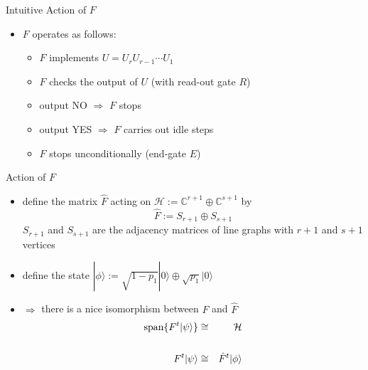\documentclass[slideColor]{prosper}
\newcommand{\C}{{\mathbb{C}}}
\newcommand{\cH}{{\mathcal{H}}}
\renewcommand{\>}{\rangle}
\newcommand{\<}{\langle}
\begin{document}
\begin{slide}{Intuitive Action of $F$}

\begin{itemize}
\item $F$ operates as follows:

\begin{itemize}
\item $F$ implements $U=U_r U_{r-1} \cdots U_1$

\medskip
\item $F$ checks the output of $U$ (with read-out gate $R$)

\medskip
\item \quad output NO $\Rightarrow$ $F$ stops

\medskip
\item \quad output YES $\Rightarrow$ $F$ carries out idle steps

\medskip
\item $F$ stops unconditionally (end-gate $E$)
\end{itemize}
\end{itemize}

\end{slide}


\begin{slide}{Action of $F$}

\begin{itemize}

\item define the matrix $\hat{F}$ acting on $\cH:=\C^{r+1}\oplus \C^{s+1}$ by 
\[
\hat{F}:=S_{r+1} \oplus S_{s+1}
\]
$S_{r+1}$ and $S_{s+1}$ are the adjacency matrices of line graphs with $r+1$ and $s+1$ vertices

\medskip
\item define the state $|\phi\>:=\sqrt{1-p_1} |0\> \oplus \sqrt{p_1} |0\>$

\medskip
\item $\Rightarrow$ there is a nice isomorphism between $F$ and $\hat{F}$
\begin{eqnarray*}
{\rm span}\{ F^t|\psi\>\} & \cong & \cH \\ 
&& \\
F^t|\psi\>                & \cong & \hat{F}^t|\phi\>
\end{eqnarray*}
\end{itemize}

\end{slide}
\end{document}
